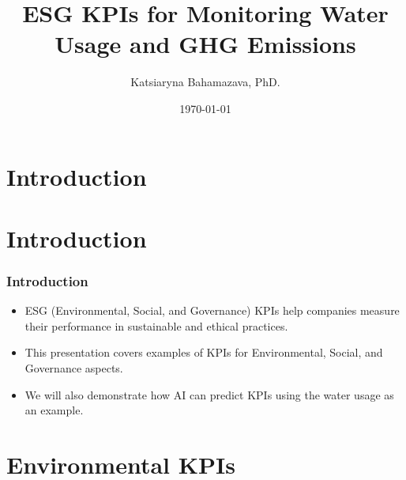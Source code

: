 \documentclass{beamer}
\title{ESG KPIs for Monitoring Water Usage and GHG Emissions}
\author{Katsiaryna Bahamazava, PhD.}
\institute{Mathematical Department of Politecnico di Torino}
\date{\today}
\begin{document}
\frame{\titlepage}

\section{Introduction}

\section{Introduction}

\begin{frame}
\frametitle{Introduction}
\begin{itemize}
    \item ESG (Environmental, Social, and Governance) KPIs help companies measure their performance in sustainable and ethical practices.
    \item This presentation covers examples of KPIs for Environmental, Social, and Governance aspects.
    \item We will also demonstrate how AI can predict KPIs using the water usage as an example.
\end{itemize}
\end{frame}

\section{Environmental KPIs}
\end{document}

